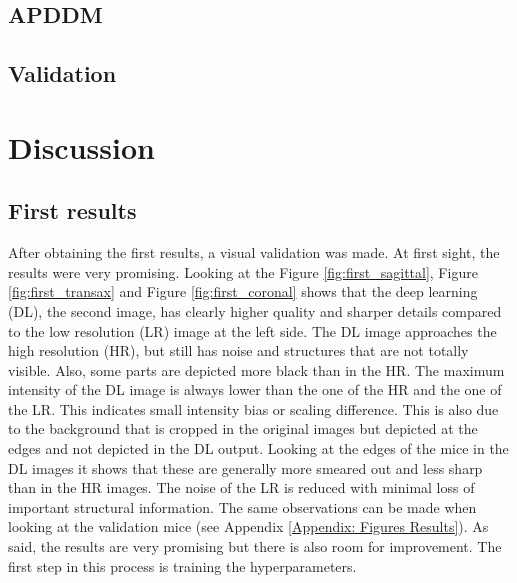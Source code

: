 \documentclass[twocolumn]{article}
\begin{document}
\begin{table}[h]
    \centering
    \caption{\label{tab:mouse_distribution} Mouse distribution across training, validation, and testing sets.}
\end{table}

    

\subsection{APDDM}

\subsection{Validation}

\section{Discussion}
\subsection{First results}
After obtaining the first results, a visual validation was made. At first sight, the results were very promising. 
Looking at the Figure \ref{fig:first_sagittal}, Figure \ref{fig:first_transax} and Figure \ref{fig:first_coronal} shows that the deep learning (DL), the second image, has clearly higher quality and sharper details compared to the low resolution (LR) image at the left side. 
The DL image approaches the high resolution (HR), but still has noise and structures that are not totally visible. 
Also, some parts are depicted more black than in the HR.
The maximum intensity of the DL image is always lower than the one of the HR and the one of the LR. 
This indicates small intensity bias or scaling difference. This is also due to the background that is cropped in the original images but depicted at the edges and not depicted in the DL output. 
Looking at the edges of the mice in the DL images it shows that these are generally more smeared out and less sharp than in the HR images. 
The noise of the LR is reduced with minimal loss of important structural information. 
The same observations can be made when looking at the validation mice (see Appendix \ref{Appendix: Figures Results}).
As said, the results are very promising but there is also room for improvement. The first step in this process is training the hyperparameters. 
\end{document}
